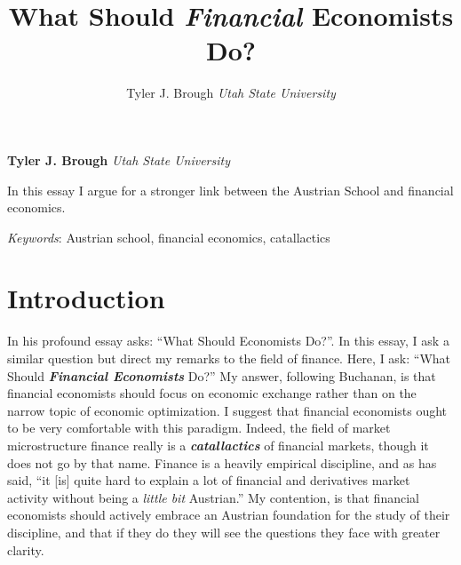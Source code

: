 \documentclass[11pt,]{article}
\title{What Should \emph{Financial} Economists Do?  }
\author{\Large Tyler J. Brough\vspace{0.05in} \newline\normalsize\emph{Utah State University}  }
\date{}
\newcommand*{\authorfont}{\fontfamily{phv}\selectfont}
\renewenvironment{abstract}
 {{%
    \setlength{\leftmargin}{0mm}
    \setlength{\rightmargin}{\leftmargin}%
  }%
  \relax}
 {\endlist}
\begin{document}
	
%

{%
\setlength{\parindent}{0pt}
\thispagestyle{plain}
{\fontsize{18}{20}\selectfont\raggedright 
\maketitle  %

}

{
   \vskip 13.5pt\relax \normalsize\fontsize{11}{12} 
\textbf{\authorfont Tyler J. Brough} \hskip 15pt \emph{\small Utah State University}   

}

}







\begin{abstract}

    \hbox{\vrule height .2pt width 39.14pc}

    \vskip 8.5pt %

\noindent In this essay I argue for a stronger link between the Austrian School
and financial economics.


\vskip 8.5pt \noindent \emph{Keywords}: Austrian school, financial economics, catallactics \par

    \hbox{\vrule height .2pt width 39.14pc}



\end{abstract}


\vskip 6.5pt

\noindent \doublespacing \section{Introduction}\label{introduction}

In his profound essay \citet{Buchanan1964} asks: ``What Should
Economists Do?''. In this essay, I ask a similar question but direct my
remarks to the field of finance. Here, I ask: ``What Should
\textbf{\emph{Financial Economists}} Do?'' My answer, following
Buchanan, is that financial economists should focus on economic exchange
rather than on the narrow topic of economic optimization. I suggest that
financial economists ought to be very comfortable with this paradigm.
Indeed, the field of market microstructure finance really is a
\textbf{\emph{catallactics}} of financial markets, though it does not go
by that name. Finance is a heavily empirical discipline, and as
\citet{Culp2004} has said, ``it {[}is{]} quite hard to explain a lot of
financial and derivatives market activity without being a \emph{little
bit} Austrian.'' My contention, is that financial economists should
actively embrace an Austrian foundation for the study of their
discipline, and that if they do they will see the questions they face
with greater clarity.
\end{document}
